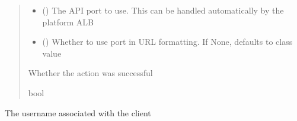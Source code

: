 \documentclass[letterpaper,10pt,english]{sphinxmanual}
\begin{document}
\begin{fulllineitems}
\begin{fulllineitems}
\begin{quote}
\begin{description}
\begin{itemize}
\item {} 
\sphinxAtStartPar
{} (\sphinxstyleliteralemphasis{\sphinxupquote{ (}}\sphinxstyleliteralemphasis{\sphinxupquote{)}}) \textendash{} The API port to use. This can be handled automatically by the platform ALB

\item {} 
\sphinxAtStartPar
{} (\sphinxstyleliteralemphasis{\sphinxupquote{ (}}\sphinxstyleliteralemphasis{\sphinxupquote{)}}) \textendash{} Whether to use port in URL formatting. If None, defaults to class value

\end{itemize}

\sphinxAtStartPar
{} \textendash{} Whether the action was successful

\sphinxAtStartPar
bool

\end{description}\end{quote}

\end{fulllineitems}


\begin{fulllineitems}
\label{\detokenize{aisquared.platform:aisquared.platform.AISquaredPlatformClient.AISquaredPlatformClient.use_port}}
\pysigstartsignatures
{}
\pysigstopsignatures
\end{fulllineitems}


\begin{fulllineitems}
\label{\detokenize{aisquared.platform:aisquared.platform.AISquaredPlatformClient.AISquaredPlatformClient.username}}
\pysigstartsignatures
{}
\pysigstopsignatures
\sphinxAtStartPar
The username associated with the client

\end{fulllineitems}


\end{fulllineitems}
\end{document}
